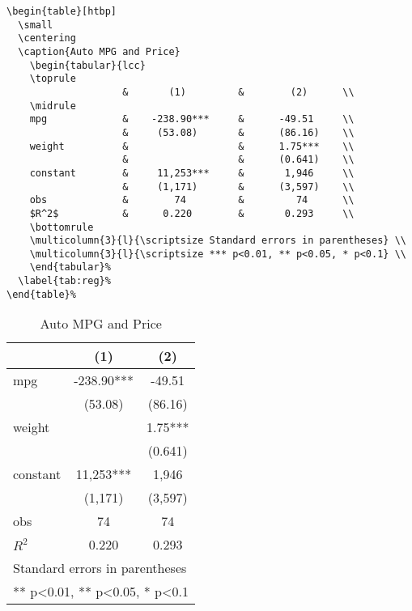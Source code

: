 \documentclass[en]{elegantpaper}
\begin{document}
\begin{lstlisting}
\begin{table}[htbp]
  \small
  \centering
  \caption{Auto MPG and Price}
    \begin{tabular}{lcc}
    \toprule
                    &       (1)         &        (2)      \\
    \midrule
    mpg             &    -238.90***     &      -49.51     \\
                    &     (53.08)       &      (86.16)    \\
    weight          &                   &      1.75***    \\
                    &                   &      (0.641)    \\
    constant        &     11,253***     &       1,946     \\
                    &     (1,171)       &      (3,597)    \\
    obs             &        74         &         74      \\
    $R^2$           &      0.220        &       0.293     \\
    \bottomrule
    \multicolumn{3}{l}{\scriptsize Standard errors in parentheses} \\
    \multicolumn{3}{l}{\scriptsize *** p<0.01, ** p<0.05, * p<0.1} \\
    \end{tabular}%
  \label{tab:reg}%
\end{table}%
\end{lstlisting}
\begin{table}[htbp]
  \small
  \centering
  \caption{Auto MPG and Price}
    \begin{tabular}{lcc}
    \toprule
                    &       (1)         &        (2)      \\
    \midrule
    mpg             &    -238.90***     &      -49.51     \\
                    &     (53.08)       &      (86.16)    \\
    weight          &                   &      1.75***    \\
                    &                   &      (0.641)    \\
    constant        &     11,253***     &       1,946     \\
                    &     (1,171)       &      (3,597)   \\
    obs             &        74         &         74     \\
    $R^2$           &      0.220        &       0.293    \\
    \bottomrule
    \multicolumn{3}{l}{\scriptsize Standard errors in parentheses} \\
    \multicolumn{3}{l}{\scriptsize *** p<0.01, ** p<0.05, * p<0.1} \\
    \end{tabular}%
  \label{tab:reg}%
\end{table}%
\end{document}

